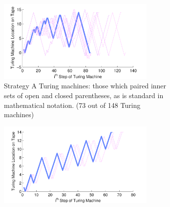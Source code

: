 \documentclass[12pt]{article}
\begin{document}
\begin{figure}[p]
\begin{subfigure}[b]{1.0\textwidth}
                \centering
                \includegraphics[width=0.85\textwidth]{tmvisualization_InnerParensMatched_allkidsAnno2}
\caption{Strategy A Turing machines: those which paired inner sets of open and closed parentheses, as is standard in mathematical notation. (73 out of 148 Turing machines)}
\label{tapeMoveA}
\end{subfigure}
\begin{subfigure}[b]{1.0\textwidth}
                \centering
                \includegraphics[width=0.85\textwidth]{tmvisualization_NtoNParensMatched_allkidsAnno2}

\end{subfigure}
\end{figure}
\end{document}
